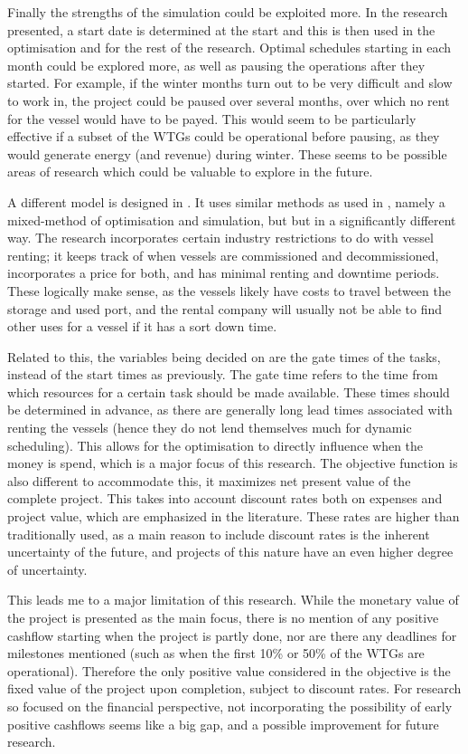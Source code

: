 \documentclass[a4paper,12pt]{article}
\begin{document}
Finally the strengths of the simulation could be exploited more. In the research presented, a start date is determined at the start and this is then used in the optimisation and for the rest of the research. Optimal schedules starting in each month could be explored more, as well as pausing the operations after they started. For example, if the winter months turn out to be very difficult and slow to work in, the project could be paused over several months, over which no rent for the vessel would have to be payed. This would seem to be particularly effective if a subset of the WTGs could be operational before pausing, as they would generate energy (and revenue) during winter. These seems to be possible areas of research which could be valuable to explore in the future.  

\bigskip

A different model is designed in \cite{kerkhove2017optimised}. It uses similar methods as used in \cite{barlow2018mixed}, namely a mixed-method of optimisation and simulation, but but in a significantly different way. The research incorporates certain industry restrictions to do with vessel renting; it keeps track of when vessels are commissioned and decommissioned, incorporates a price for both, and has minimal renting and downtime periods. These logically make sense, as the vessels likely have costs to travel between the storage and used port, and the rental company will usually not be able to find other uses for a vessel if it has a sort down time. 

Related to this, the variables being decided on are the gate times of the tasks, instead of the start times as previously. The gate time refers to the time from which resources for a certain task should be made available. These times should be determined in advance, as there are generally long lead times associated with renting the vessels (hence they do not lend themselves much for dynamic scheduling). This allows for the optimisation to directly influence when the money is spend, which is a major focus of this research. The objective function is also different to accommodate this, it maximizes net present value of the complete project. This takes into account discount rates both on expenses and project value, which are emphasized in the literature. These rates are higher than traditionally used, as a main reason to include discount rates is the inherent uncertainty of the future, and projects of this nature have an even higher degree of uncertainty.

This leads me to a major limitation of this research. While the monetary value of the project is presented as the main focus, there is no mention of any positive cashflow starting when the project is partly done, nor are there any deadlines for milestones mentioned (such as when the first 10\% or 50\% of the WTGs are operational). Therefore the only positive value considered in the objective is the fixed value of the project upon completion, subject to discount rates. For research so focused on the financial perspective, not incorporating the possibility of early positive cashflows seems like a big gap, and a possible improvement for future research.
\end{document}
